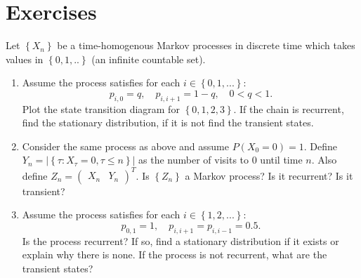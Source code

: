 \section{Exercises}
\begin{exercise}
Let $\left\{ {{X_n}} \right\}$  be a time-homogenous Markov processes in discrete time which takes values in $\left\{ {0,1,..} \right\}$ (an infinite countable set).
\begin{enumerate}
  \item Assume the process satisfies for each $i \in \left\{ {0,1,...} \right\}$:
$${p_{i,0}} = q, \quad {p_{i,i + 1}} = 1 - q, \quad 0 < q < 1.$$
Plot the state transition diagram for $\left\{ {0,1,2,3} \right\}$. If the chain is recurrent, find the stationary distribution, if it is not find the transient states.
  \item Consider the same process as above and assume $P\left( {{X_0} = 0} \right) = 1$. Define ${Y_n} = \left| {\left\{ {\tau :{X_\tau } = 0,\tau  \le n} \right\}} \right|$ as the number of visits to 0 until time $n$. Also define ${Z_n} = {\left( {\begin{array}{*{20}{c}} {{X_n}}&{{Y_n}}\end{array}}\right)^T}$. Is $\left\{ {{Z_n}} \right\}$ a Markov process? Is it recurrent? Is it transient?
  \item Assume the process satisfies for each $i \in \left\{ {1,2,...} \right\}$:
$${p_{0,1}} = 1, \quad {p_{i,i + 1}} = {p_{i,i - 1}} = 0.5.$$
Is the process recurrent? If so, find a stationary distribution if it exists or explain why there is none. If the process is not recurrent, what are the transient states?
\end{enumerate}
\end{exercise}
